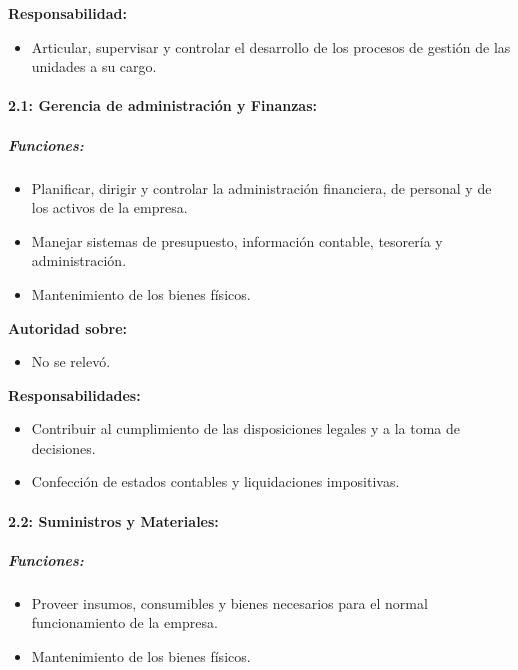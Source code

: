 \documentclass[a4paper,10pt]{article}
\begin{document}
		\textbf{Responsabilidad:}
		\begin{itemize}
		\item Articular, supervisar y controlar el desarrollo de los procesos de gestión de las unidades a su cargo.
		\end{itemize}

		\paragraph{2.1: Gerencia de administración y Finanzas:}
		
		\subparagraph{Funciones:}

		\begin{itemize}
			\item Planificar, dirigir y controlar la administración financiera, de personal y de los activos de la empresa.
 			\item Manejar sistemas de presupuesto, información contable, tesorería y administración.
 			\item Mantenimiento de los bienes físicos.

 		\end{itemize}
		
		\textbf{Autoridad sobre:} 
		\begin{itemize}
		\item No se relevó.
		\end{itemize}


		\textbf{Responsabilidades:}
		\begin{itemize}
			\item Contribuir al cumplimiento de las disposiciones legales y a la toma de decisiones.
			\item Confección de estados contables y liquidaciones impositivas.
		\end{itemize}	

			\paragraph{2.2: Suministros y Materiales:}
		
		\subparagraph{Funciones:}
		\begin{itemize}
 			\item Proveer insumos, consumibles y bienes necesarios para el normal funcionamiento de la empresa.
 			\item Mantenimiento de los bienes físicos.

 		\end{itemize}
		
\end{document}

